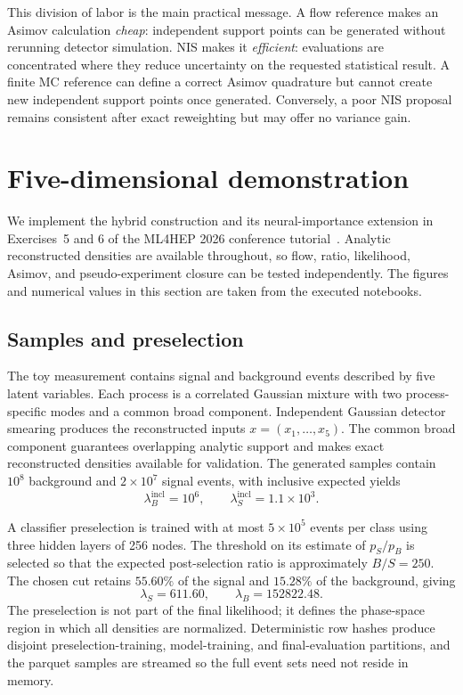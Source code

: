 \documentclass[
  aps,
  prd,
  superscriptaddress,
  nofootinbib,
  longbibliography,
  12pt
]{revtex4-2}
\begin{document}
This division of labor is the main practical message.  A flow reference makes an Asimov calculation \emph{cheap}: independent support points can be generated without rerunning detector simulation.  NIS makes it \emph{efficient}: evaluations are concentrated where they reduce uncertainty on the requested statistical result.  A finite MC reference can define a correct Asimov quadrature but cannot create new independent support points once generated.  Conversely, a poor NIS proposal remains consistent after exact reweighting but may offer no variance gain.

\section{Five-dimensional demonstration}
\label{sec:demonstration}

We implement the hybrid construction and its neural-importance extension in Exercises~5 and 6 of the ML4HEP 2026 conference tutorial~\cite{HybridNSBI:2026code,NISAsimov:2026code,Sandesara:2026lectures}.  Analytic reconstructed densities are available throughout, so flow, ratio, likelihood, Asimov, and pseudo-experiment closure can be tested independently.  The figures and numerical values in this section are taken from the executed notebooks.

\subsection{Samples and preselection}

The toy measurement contains signal and background events described by five latent variables.  Each process is a correlated Gaussian mixture with two process-specific modes and a common broad component.  Independent Gaussian detector smearing produces the reconstructed inputs $x=(x_1,\ldots,x_5)$.  The common broad component guarantees overlapping analytic support and makes exact reconstructed densities available for validation.  The generated samples contain $10^8$ background and $2\times10^7$ signal events, with inclusive expected yields
\begin{equation}
  \lambda_B^{\mathrm{incl}}=10^6,
  \qquad
  \lambda_S^{\mathrm{incl}}=1.1\times10^3.
\end{equation}

A classifier preselection is trained with at most $5\times10^5$ events per class using three hidden layers of 256 nodes.  The threshold on its estimate of $p_S/p_B$ is selected so that the expected post-selection ratio is approximately $B/S=250$.  The chosen cut retains $55.60\%$ of the signal and $15.28\%$ of the background, giving
\begin{equation}
  \lambda_S=611.60,
  \qquad
  \lambda_B=152822.48.
  \label{eq:postselection-yields}
\end{equation}
The preselection is not part of the final likelihood; it defines the phase-space region in which all densities are normalized.  Deterministic row hashes produce disjoint preselection-training, model-training, and final-evaluation partitions, and the parquet samples are streamed so the full event sets need not reside in memory.
\end{document}
